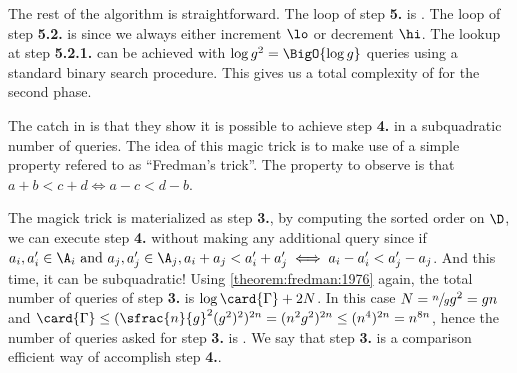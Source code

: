 The rest of the algorithm is straightforward. The loop of step \textbf{5.} is
. The loop of step \textbf{5.2.} is  since we
always either increment $\lo$ or decrement $\hi$. The lookup at step
\textbf{5.2.1.} can be achieved with $\log g^2 = \BigO{\log g}$ queries using
a standard binary search procedure. This gives us a total complexity of
 for the second phase.

The catch in \cite{gronlund:2014} is that they show it is possible to
achieve step \textbf{4.} in a subquadratic number of queries. The idea of this
magic trick is to make use of a simple property refered to as ``Fredman's
trick''. The property to observe is that $a + b < c + d \iff a - c < d - b$.

The magick trick is materialized as step \textbf{3.}, by computing the sorted
order on $\D$, we can execute step \textbf{4.} without making any additional
query since if $a_i, a_i' \in \A_i \text{ and } a_j, a_j' \in \A_j, a_i + a_j <
a_i' + a_j' \iff a_i - a_i' < a_j' - a_j$. And this time, it can be
subquadratic! Using \ref{theorem:fredman:1976} again, the total number of
queries of step \textbf{3.} is $\log \card{\Gamma} + 2N$. In this case $N =
\sfrac{n}{g}g^2 = gn$ and $\card{\Gamma} \le (\sfrac{n}{g}^2 (g^2)^2)^{2n} =
(n^2 g^2)^{2n} \le (n^4)^{2n} = n^{8n}$, hence the number of queries asked for
step \textbf{3.} is . We say that step \textbf{3.} is a
comparison efficient way of accomplish step \textbf{4.}.



